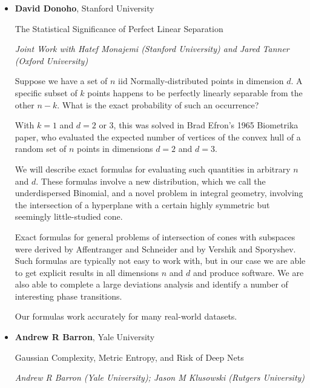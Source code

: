 \begin{itemize}
\item \textbf{David Donoho}, Stanford University

The Statistical Significance of Perfect Linear Separation

\emph{\footnotesize Joint Work with Hatef Monajemi (Stanford University) and Jared Tanner (Oxford University)}

Suppose we have a set of $n$ iid Normally-distributed points in dimension $d$. A specific subset of $k$ points happens to be perfectly linearly separable from the other $n-k$. What is the exact probability of such an occurrence?

With $k=1$ and $d=2$ or $3$, this was solved in Brad Efron's 1965 Biometrika paper, who evaluated the expected number of vertices of the convex hull of a random set of $n$ points in dimensions $d=2$ and $d=3$.

We will describe exact formulas for evaluating such quantities in arbitrary $n$ and $d$. These formulas involve a new distribution, which we call the underdispersed Binomial, and a novel problem in integral geometry, involving the intersection of a hyperplane with a certain highly symmetric but seemingly little-studied cone.

Exact formulas for general problems of intersection of cones with subspaces were derived by Affentranger and Schneider and by Vershik and Sporyshev. Such formulas  are typically not easy to work with, but in our case we are able to get explicit results in all dimensions $n$ and $d$ and produce software.  We are also able to complete a large deviations analysis and identify a number of interesting phase transitions.

Our formulas work accurately for many real-world datasets.

\item \textbf{Andrew R Barron}, Yale University

Gaussian Complexity, Metric Entropy, and Risk of Deep Nets

\emph{\footnotesize Andrew R Barron (Yale University); Jason M Klusowski (Rutgers University)}


\end{itemize}
